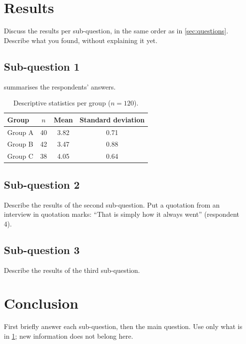 \documentclass[11pt, a4paper, oneside]{report}
\begin{document}
\chapter{Results}
\label{ch:results}
Discuss the results per sub-question, in the same order as in
\cref{sec:questions}. Describe what you found, without explaining it yet.

\section{Sub-question 1}
 summarises the respondents' answers.

\begin{table}[htbp]
  \centering
  \caption{Descriptive statistics per group ($n = 120$).}
  \label{tab:descriptive}
  \begin{tabular}{l S[table-format=2.0] S[table-format=1.2] S[table-format=1.2]}
    \toprule
    Group & {$n$} & {Mean} & {Standard deviation} \\
    \midrule
    Group A & 40 & 3.82 & 0.71 \\
    Group B & 42 & 3.47 & 0.88 \\
    Group C & 38 & 4.05 & 0.64 \\
    \bottomrule
  \end{tabular}
\end{table}

\section{Sub-question 2}
Describe the results of the second sub-question. Put a quotation from an
interview in quotation marks: \enquote{That is simply how it always went}
(respondent 4).

\section{Sub-question 3}
Describe the results of the third sub-question.

\chapter{Conclusion}
\label{ch:conclusion}
First briefly answer each sub-question, then the main question. Use only
what is in \cref{ch:results}; new information does not belong here.
\end{document}
